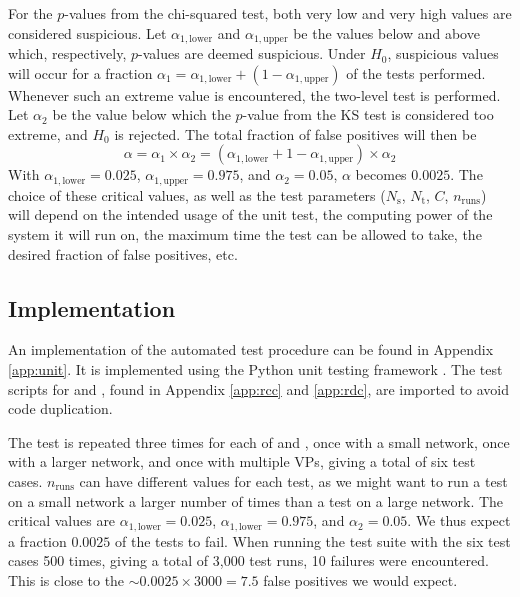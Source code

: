 For the $p$-values from the chi-squared test, both very low and very high values are considered suspicious. Let $\alpha_{1,\text{lower}}$ and $\alpha_{1,\text{upper}}$ be the values below and above which, respectively, $p$-values are deemed suspicious. Under $H_0$, suspicious values will occur for a fraction $\alpha_1 = \alpha_{1,\text{lower}} + \left(1 - \alpha_{1,\text{upper}}\right)$ of the tests performed. Whenever such an extreme value is encountered, the two-level test is performed. Let $\alpha_2$ be the value below which the $p$-value from the KS test is considered too extreme, and $H_0$ is rejected. The total fraction of false positives will then be
\begin{equation}
\alpha = \alpha_1 \times \alpha_2 = \left( \alpha_{1,\text{lower}} + 1 - \alpha_{1,\text{upper}} \right) \times \alpha_2
\end{equation}
With $\alpha_{1,\text{lower}} = 0.025$, $\alpha_{1,\text{upper}} = 0.975$, and $\alpha_2 = 0.05$, $\alpha$ becomes $0.0025$. The choice of these critical values, as well as the test parameters ($N_\text{s}$, $N_\text{t}$, $C$, $n_\text{runs}$) will depend on the intended usage of the unit test, the computing power of the system it will run on, the maximum time the test can be allowed to take, the desired fraction of false positives, etc. 



\subsection{Implementation\label{subsec:autoimp}}

An implementation of the automated test procedure can be found in Appendix \ref{app:unit}. It is implemented using the Python unit testing framework . The test scripts for  and , found in Appendix \ref{app:rcc} and \ref{app:rdc}, are imported to avoid code duplication. 

The test is repeated three times for each of  and , once with a small network, once with a larger network, and once with multiple VPs, giving a total of six test cases. $n_\text{runs}$ can have different values for each test, as we might want to run a test on a small network a larger number of times than a test on a large network. The critical values are $\alpha_{1,\text{lower}} = 0.025$, $\alpha_{1,\text{lower}} = 0.975$, and $\alpha_2 = 0.05$. We thus expect a fraction $0.0025$ of the tests to fail. When running the test suite with the six test cases 500 times, giving a total of 3,000 test runs, 10 failures were encountered. This is close to the $\sim 0.0025\times3000 = 7.5$ false positives we would expect.

